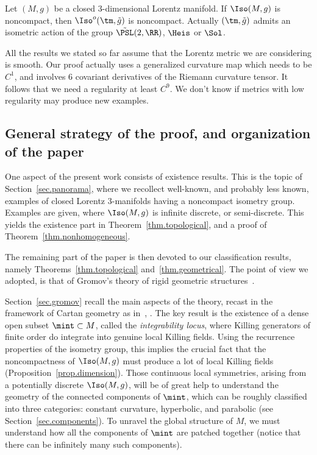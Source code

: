 \begin{corox}\label{coro.action.universel}
Let $(M,g)$ be a closed $3$-dimensional Lorentz manifold. If $\Iso(M,g)$ is noncompact, then $\Iso^o(\tm,\tilde{g})$ is noncompact. Actually $(\tm,\tilde{g})$ admits an isometric action of the group $\tilde{\PSL}(2,\RR)$, $\Heis$ or $\Sol$.
\end{corox}

All the results we stated so far assume that the Lorentz metric we are considering is smooth. Our proof actually uses a generalized curvature map which needs to be $C^1$, and involves 6 covariant derivatives of the Riemann curvature tensor. It follows that we need a regularity at least $C^9$. We don't know if metrics with low regularity may produce new examples.


\subsection{General strategy of the proof, and organization of the paper}

One aspect of the present work consists of existence results. This is the topic of Section~\ref{sec.panorama}, where we recollect well-known, and probably less known, examples of closed Lorentz $3$-manifolds having a noncompact isometry group. Examples are given, where $\Iso(M,g)$ is infinite discrete, or semi-discrete. This yields the existence part in Theorem~\ref{thm.topological}, and a proof of Theorem~\ref{thm.nonhomogeneous}.

The remaining part of the paper is then devoted to our classification results, namely Theorems~\ref{thm.topological} and~\ref{thm.geometrical}. The point of view we adopted, is that of Gromov's theory of rigid geometric structures~\cite{gromov}.

Section~\ref{sec.gromov} recall the main aspects of the theory, recast in the framework of Cartan geometry as in~\cite{melnick}, \cite{vincent}. The key result is the existence of a dense open subset $\mint \subset M$, called the \emph{integrability locus}, where Killing generators of finite order do integrate into genuine local Killing fields. Using the recurrence properties of the isometry group, this implies the crucial fact that the noncompactness of $\Iso(M,g)$ must produce a lot of local Killing fields (Proposition~\ref{prop.dimension}). Those continuous local symmetries, arising from a potentially discrete $\Iso(M,g)$, will be of great help to understand the geometry of the connected components of $\mint$, which can be roughly classified into three categories: constant curvature, hyperbolic, and parabolic (see Section~\ref{sec.components}). To unravel the global structure of $M$, we must understand how all the components of $\mint$ are patched together (notice that there can be infinitely many such components).

